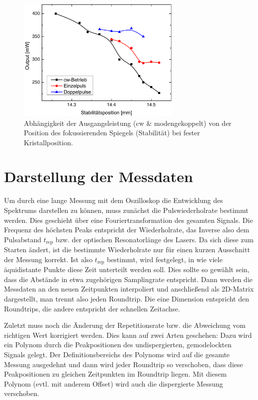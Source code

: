 \documentclass[bachelor,       %
               twoside,        %
               BCOR10mm,       %
               liststotoc,nomtotoc,bibtotoc, %
               english,ngerman, %
               final,          %
               ]{GAUBM}
\begin{document}
\begin{figure}[!htb]
	\centering
	\includegraphics[width=0.7\textwidth]{figures/map2.pdf}
	\caption{Abhängigkeit der Ausgangsleistung (cw \& modengekoppelt) von der Position des fokussierenden Spiegels (Stabilität) bei fester Kristallposition.}
	\label{fig:map2}
\end{figure}


\section{Darstellung der Messdaten}
Um durch eine lange Messung mit dem Oszilloskop die Entwicklung des Spektrums darstellen zu können, muss zunächst die Pulswiederholrate bestimmt werden.
Dies geschieht über eine Fouriertransformation des gesamten Signals.
Die Frequenz des höchsten Peaks entspricht der Wiederholrate, das Inverse also dem Pulsabstand $t_\text{rep}$ bzw. der optischen Resonatorlänge des Lasers.
Da sich diese zum Starten ändert, ist die bestimmte Wiederholrate nur für einen kurzen Ausschnitt der Messung korrekt.
Ist also $t_\text{rep}$ bestimmt, wird festgelegt, in wie viele äquidistante Punkte diese Zeit unterteilt werden soll.
Dies sollte so gewählt sein, dass die Abstände in etwa zugehörigen Samplingrate entspricht.
Dann werden die Messdaten an den neuen Zeitpunkten interpoliert und anschließend als 2D-Matrix dargestellt, man trennt also jeden Roundtrip.
Die eine Dimension entspricht den Roundtrips, die andere entspricht der schnellen Zeitachse.

Zuletzt muss noch die Änderung der Repetitionsrate bzw. die Abweichung vom richtigen Wert korrigiert werden.
Dies kann auf zwei Arten geschehen:
Dazu wird ein Polynom durch die Peakpositionen des undispergierten, gemodelockten Signals gelegt. Der Definitionsbereichs des Polynoms wird auf die gesamte Messung ausgedehnt und dann wird jeder Roundtrip so verschoben, dass diese Peakpositionen zu gleichen Zeitpunkten im Roundtrip liegen.
Mit diesem Polynom (evtl. mit anderem Offset) wird auch die dispergierte Messung verschoben.
\end{document}
